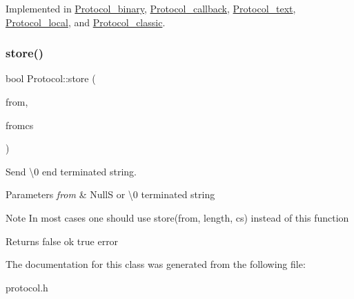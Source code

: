 Implemented in \mbox{\hyperlink{classProtocol__binary_ae3111e401880cd6d68b3587e2fbb8091}{Protocol\+\_\+binary}}, \mbox{\hyperlink{classProtocol__callback_a951efbe2b108b81630d827830f89b3d7}{Protocol\+\_\+callback}}, \mbox{\hyperlink{classProtocol__text_a72aad9182cd1313187654ba88712d54a}{Protocol\+\_\+text}}, \mbox{\hyperlink{classProtocol__local_a9cc8d72321e90ebed9432e01bac634b4}{Protocol\+\_\+local}}, and \mbox{\hyperlink{classProtocol__classic_acebdc50db1e9403c19bb8909af300fec}{Protocol\+\_\+classic}}.

\mbox{\label{classProtocol_aa8bf8380dcfeb6df40de6a40f5485a7f}} 
\subsubsection{\texorpdfstring{store()}{store()}}
{\footnotesize\ttfamily bool Protocol\+::store (\begin{DoxyParamCaption}\item[{const char $\ast$}]{from,  }\item[{const C\+H\+A\+R\+S\+E\+T\+\_\+\+I\+N\+FO $\ast$}]{fromcs }\end{DoxyParamCaption})\hspace{0.3cm}{\ttfamily [inline]}}

Send \textbackslash{}0 end terminated string.


\begin{DoxyParams}{Parameters}
{\em from} & NullS or \textbackslash{}0 terminated string\\
\hline
\end{DoxyParams}
\begin{DoxyNote}{Note}
In most cases one should use store(from, length, cs) instead of this function
\end{DoxyNote}
\begin{DoxyReturn}{Returns}
false ok true error 
\end{DoxyReturn}


The documentation for this class was generated from the following file\+:\begin{DoxyCompactItemize}
\item 
protocol.\+h\end{DoxyCompactItemize}
